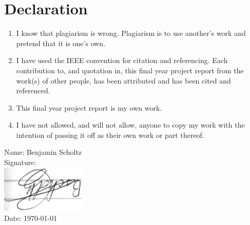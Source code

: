 \chapter{Declaration}
\begin{enumerate}
\item I know that plagiarism is wrong. Plagiarism is to use another's work and pretend that it
is one's own.
\item I have used the IEEE convention for citation and referencing. Each contribution to, and
quotation in, this final year project report from the work(s) of other people, has been attributed and has been cited and referenced.
\item This final year project report is my own work.
\item I have not allowed, and will not allow, anyone to copy my work with the intention of passing it off as their own work or part thereof.
\end{enumerate}

\bigskip

\noindent
Name: Benjamin Scholtz \\
Signature: \\
\includegraphics[angle=90,origin=c,width = 0.3\textwidth]{images/signature} \\
Date: \today \\